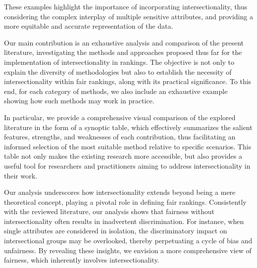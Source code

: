 
These examples highlight the importance of incorporating intersectionality, thus considering the complex interplay of multiple sensitive attributes, and providing a more equitable and accurate representation of the data.

Our main contribution is an exhaustive analysis and comparison of the present literature, investigating the methods and approaches proposed thus far for the implementation of intersectionality in rankings. The objective is not only to explain the diversity of methodologies but also to establish the necessity of intersectionality within fair rankings, along with its practical significance. To this end, for each category of methods, we also include an exhaustive example showing how such methods may work in practice.

In particular, we provide a comprehensive visual comparison of the explored literature in the form of a synoptic table, which effectively summarizes the salient features, strengths, and weaknesses of each contribution, thus facilitating an informed selection of the most suitable method relative to specific scenarios. This table not only makes the existing research more accessible, but also provides a useful tool for researchers and practitioners aiming to address intersectionality in their work.

Our analysis underscores how intersectionality extends beyond being a mere theoretical concept, playing a pivotal role in defining fair rankings. Consistently with the reviewed literature, our analysis shows that fairness without intersectionality often results in inadvertent discrimination. For instance, when single attributes are considered in isolation, the discriminatory impact on intersectional groups may be overlooked, thereby perpetuating a cycle of bias and unfairness. By revealing these insights, we envision a more comprehensive view of fairness, which inherently involves intersectionality.


